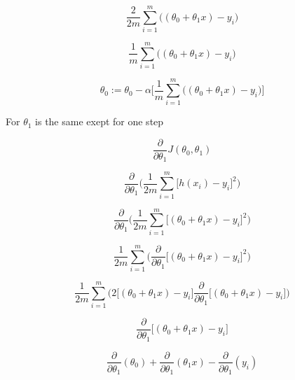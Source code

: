 \documentclass[12pt,journal]{IEEEtran}
\begin{document}
    \begin{equation}
        \frac{2}{2m} \sum_{i=1}^{m} \Big( (\theta_0 + \theta_1 x) - y_i \Big)
    \end{equation}

    \begin{equation}
        \frac{1}{m} \sum_{i=1}^{m} \Big( (\theta_0 + \theta_1 x) - y_i \Big)
    \end{equation}

    \begin{equation}
        \theta_0 := \theta_0 - \alpha \Big[ \frac{1}{m} \sum_{i=1}^{m} \Big( (\theta_0 + \theta_1 x) - y_i \Big) \Big]
    \end{equation}

    For $\theta_1$ is the same exept for one step

    \begin{equation}
        \frac{\partial}{\partial \theta_1} J(\theta_0, \theta_1)
    \end{equation}

    \begin{equation}
        \frac{\partial}{\partial \theta_1} \bigg( \frac{1}{2m} \sum_{i=1}^{m} \big[ h(x_i) - y_i\big] ^2  \bigg)
    \end{equation}

    \begin{equation}
        \frac{\partial}{\partial \theta_1} \bigg( \frac{1}{2m} \sum_{i=1}^{m} \Big[ (\theta_0 + \theta_1 x) - y_i \Big]^2  \bigg)
    \end{equation}

    \begin{equation}
        \frac{1}{2m} \sum_{i=1}^{m} \bigg( \frac{\partial}{\partial \theta_1} \Big[ (\theta_0 + \theta_1 x) - y_i \Big]^2  \bigg)
    \end{equation}

    \begin{equation}
        \frac{1}{2m} \sum_{i=1}^{m} \bigg( 2 \Big[ (\theta_0 + \theta_1 x) - y_i \Big] \frac{\partial}{\partial \theta_1} \Big[ (\theta_0 + \theta_1 x) - y_i \Big] \bigg)
    \end{equation}

    \begin{equation}
    \frac{\partial}{\partial \theta_1} \Big[ (\theta_0 + \theta_1 x) - y_i \Big]
    \end{equation}

    \begin{equation}
    \frac{\partial}{\partial \theta_1} ( \theta_0 ) + \frac{\partial}{\partial \theta_1} ( \theta_1 x ) - \frac{\partial}{\partial \theta_1} ( y_i )
    \end{equation}
\end{document}
